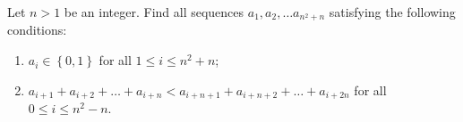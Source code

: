 Let $ n > 1$ be an integer. Find all sequences $ a_1, a_2, \ldots a_{n^2 + n}$ satisfying the following conditions:

\begin{enumerate}[label = (\alph*)]
	\item $a_i \in \left\{0,1\right\}$ for all $1 \leq i \leq n^2 + n$;
	\item $a_{i + 1} + a_{i + 2} + \ldots + a_{i + n} < a_{i + n + 1} + a_{i + n + 2} + \ldots + a_{i + 2n}$ for all $0 \leq i \leq n^2 - n$.
\end{enumerate}
